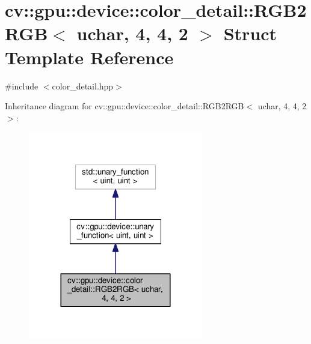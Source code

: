 \hypertarget{structcv_1_1gpu_1_1device_1_1color__detail_1_1RGB2RGB_3_01uchar_00_014_00_014_00_012_01_4}{\section{cv\-:\-:gpu\-:\-:device\-:\-:color\-\_\-detail\-:\-:R\-G\-B2\-R\-G\-B$<$ uchar, 4, 4, 2 $>$ Struct Template Reference}
\label{structcv_1_1gpu_1_1device_1_1color__detail_1_1RGB2RGB_3_01uchar_00_014_00_014_00_012_01_4}
}


{\ttfamily \#include $<$color\-\_\-detail.\-hpp$>$}



Inheritance diagram for cv\-:\-:gpu\-:\-:device\-:\-:color\-\_\-detail\-:\-:R\-G\-B2\-R\-G\-B$<$ uchar, 4, 4, 2 $>$\-:\nopagebreak
\begin{figure}[H]
\begin{center}
\leavevmode
\includegraphics[width=216pt]{structcv_1_1gpu_1_1device_1_1color__detail_1_1RGB2RGB_3_01uchar_00_014_00_014_00_012_01_4__inherit__graph}
\end{center}
\end{figure}


